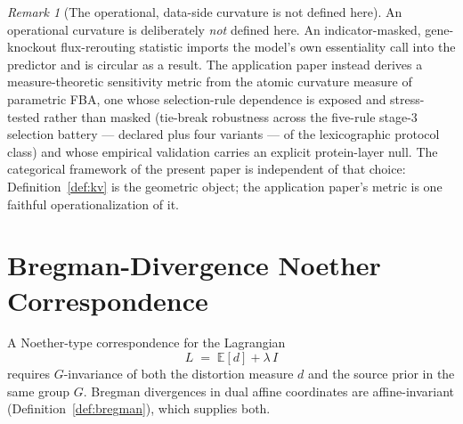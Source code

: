 \documentclass[11pt,a4paper]{article}
\theoremstyle{plain}
\theoremstyle{definition}
\theoremstyle{remark}
\newtheorem{remark}[theorem]{Remark}
\begin{document}
\begin{remark}[The operational, data-side curvature is not defined here]
\label{rem:fba-kappa-superseded}
An operational curvature is deliberately \emph{not} defined here. An
indicator-masked, gene-knockout flux-rerouting statistic imports
the model's own essentiality call into the predictor and is
circular as a result. The application paper \citep{zai2026measure}
instead derives a measure-theoretic sensitivity metric from the
atomic curvature measure of parametric FBA, one whose
selection-rule dependence is exposed and stress-tested rather than
masked (tie-break robustness across the five-rule stage-3 selection
battery --- declared plus four variants --- of the lexicographic
protocol class) and whose empirical validation carries an explicit
protein-layer null. The categorical framework of
the present paper is independent of that choice:
Definition~\ref{def:kv}
is the geometric object; the application paper's metric is one
faithful operationalization of it.
\end{remark}


\section{Bregman-Divergence Noether Correspondence}\label{sec:noether}

A Noether-type correspondence for the Lagrangian
\begin{equation}\label{eq:lagrangian}
  L \;=\; \mathbb{E}[d] + \lambda\, I
\end{equation}
requires $G$-invariance of both the distortion measure $d$ and the
source prior in the same group $G$. Bregman divergences in dual affine
coordinates are affine-invariant (Definition~\ref{def:bregman}), which
supplies both.
\end{document}
